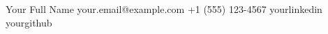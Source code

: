 
\resumeheader
    {Your Full Name}              %
    {your.email@example.com}      %
    {+1 (555) 123-4567}          %
    {yourlinkedin}               %
    {yourgithub}                 %
